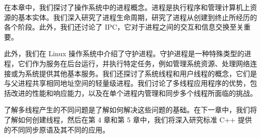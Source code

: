 在本章中，我们探讨了操作系统中的进程概念。进程是执行程序和管理计算机上资源的基本实体。我们深入研究了进程生命周期，研究了进程从创建到终止所经历的各个阶段。此外，我们还讨论了 IPC，它对于进程之间的交互和信息交换至关重要。

此外，我们在 Linux 操作系统中介绍了守护进程。守护进程是一种特殊类型的进程，它们作为服务在后台运行，并执行特定任务，例如管理系统资源、处理网络连接或为系统提供其他基本服务。我们还探讨了系统线程和用户线程的概念，它们是与父进程共享相同地址空间的轻量级进程。我们讨论了多线程应用程序的优势，包括改进的性能和响应能力，以及在单个进程内管理和同步多个线程所面临的挑战。

了解多线程产生的不同问题是了解如何解决这些问题的基础。在下一章中，我们将了解如何创建线程，然后在第 4 章和第 5 章中，我们将深入研究标准 C++ 提供的不同同步原语及其不同的应用。